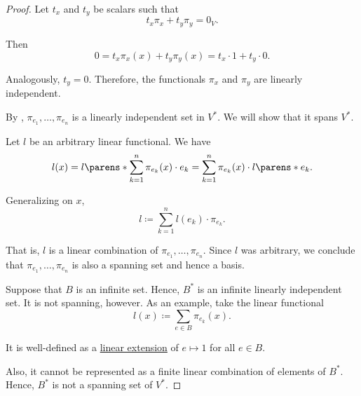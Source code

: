 \begin{proof}
   Let \( t_x \) and \( t_y \) be scalars such that
  \begin{equation*}
    t_x \pi_x + t_y \pi_y = 0_V.
  \end{equation*}

  Then
  \begin{equation*}
    0 = t_x \pi_x(x) + t_y \pi_y(x) = t_x \cdot 1 + t_y \cdot 0.
  \end{equation*}

  Analogously, \( t_y = 0 \). Therefore, the functionals \( \pi_x \) and \( \pi_y \) are linearly independent.

   By , \( \pi_{e_1}, \ldots, \pi_{e_n} \) is a linearly independent set in \( V^* \). We will show that it spans \( V^* \).

  Let \( l \) be an arbitrary linear functional. We have
  \begin{equation*}
    l(x) = l\parens*{ \sum_{k=1}^n \pi_{e_k}(x) \cdot e_k } = \sum_{k=1}^n \pi_{e_k}(x) \cdot l\parens*{ e_k }.
  \end{equation*}

  Generalizing on \( x \),
  \begin{equation*}
    l \coloneqq \sum_{k=1}^n l(e_k) \cdot \pi_{e_k}.
  \end{equation*}

  That is, \( l \) is a linear combination of \( \pi_{e_1}, \ldots, \pi_{e_n} \). Since \( l \) was arbitrary, we conclude that \( \pi_{e_1}, \ldots, \pi_{e_n} \) is also a spanning set and hence a basis.

   Suppose that \( B \) is an infinite set. Hence, \( B^* \) is an infinite linearly independent set. It is not spanning, however. As an example, take the linear functional
  \begin{equation*}
    l(x) \coloneqq \sum_{e \in B} \pi_{e_k}(x).
  \end{equation*}

  It is well-defined as a \hyperref[thm:free_semimodule_universal_property]{linear extension} of \( e \mapsto 1 \) for all \( e \in B \).

  Also, it cannot be represented as a finite linear combination of elements of \( B^* \). Hence, \( B^* \) is not a spanning set of \( V^* \).
\end{proof}

